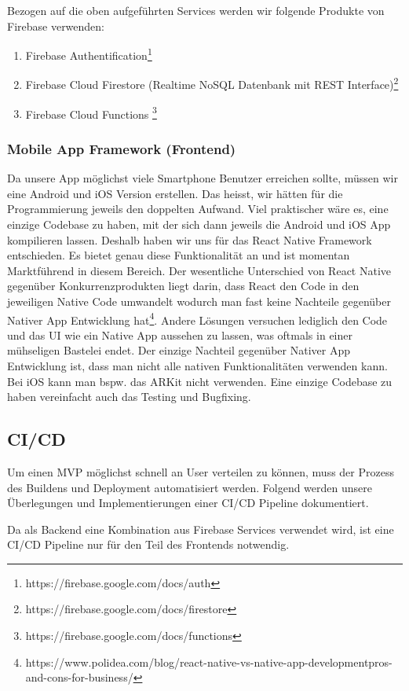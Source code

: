 Bezogen auf die oben aufgeführten Services werden wir folgende Produkte von Firebase verwenden:
\begin{enumerate}
    \item Firebase Authentification\footnote{https://firebase.google.com/docs/auth}
    \item Firebase Cloud Firestore (Realtime NoSQL Datenbank mit REST Interface)\footnote{https://firebase.google.com/docs/firestore}
    \item Firebase Cloud Functions \footnote{https://firebase.google.com/docs/functions}
\end{enumerate}


\subsubsection{Mobile App Framework (Frontend)}
Da unsere App möglichst viele Smartphone Benutzer erreichen sollte, müssen wir eine Android und iOS Version erstellen. Das heisst, wir hätten für die Programmierung jeweils den doppelten Aufwand. Viel praktischer wäre es, eine einzige Codebase zu haben, mit der sich dann jeweils die Android und iOS App kompilieren lassen. Deshalb haben wir uns für das React Native Framework entschieden. Es bietet genau diese Funktionalität an und ist momentan Marktführend in diesem Bereich. Der wesentliche Unterschied von React Native gegenüber Konkurrenzprodukten liegt darin, dass React den Code in den jeweiligen Native Code umwandelt wodurch man fast keine Nachteile gegenüber Nativer App Entwicklung hat\footnote{https://www.polidea.com/blog/react-native-vs-native-app-developmentpros-and-cons-for-business/}. Andere Lösungen versuchen lediglich den Code und das UI wie ein Native App aussehen zu lassen, was oftmals in einer mühseligen Bastelei endet. Der einzige Nachteil gegenüber Nativer App Entwicklung ist, dass man nicht alle nativen Funktionalitäten verwenden kann. Bei iOS kann man bspw. das ARKit nicht verwenden. Eine einzige Codebase zu haben vereinfacht auch das Testing und Bugfixing.


\subsection{CI/CD}
Um einen MVP möglichst schnell an User verteilen zu können, muss  der Prozess des Buildens und Deployment automatisiert werden. Folgend werden unsere Überlegungen und Implementierungen einer CI/CD Pipeline dokumentiert. 

Da als Backend eine Kombination aus Firebase Services verwendet wird, ist eine CI/CD Pipeline nur für den Teil des Frontends notwendig.

